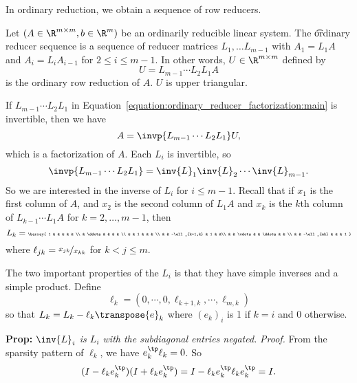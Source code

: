 

In ordinary reduction, we obtain a sequence of row reducers.


Let $(A \in \R^{m \times m}, b \in \R^{m})$ be an ordinarily reducible linear system.
The \t{ordinary reducer sequence} is a sequence of reducer matrices $L_{1}, \dots L_{m-1}$ with $A_1 = L_1A$ and $A_i = L_iA_{i-1}$ for $2 \leq i \leq m-1$.
In other words, $U \in \R^{m \times m}$ defined by
\begin{equation}
	U = L_{m-1} \cdots L_2 L_1 A
	\label{equation:ordinary_reducer_factorization:main}
\end{equation}
is the ordinary row reduction of $A$.
$U$ is upper triangular.

If $L_{m-1}\cdots L_2 L_1$ in Equation~\eqref{equation:ordinary_reducer_factorization:main} is invertible, then we have
\[
  A = \invp{L_{m-1}\cdots L_2 L_1}U,
\]
which is a factorization of $A$.
Each $L_i$ is invertible, so
\[
  \invp{L_{m-1}\cdots L_2 L_1} = \inv{L}_1\inv{L}_2\cdots\inv{L}_{m-1}.
\]
So we are interested in the inverse of $L_i$ for $i \leq m-1$.
Recall that if $x_1$ is the first column of $A$, and $x_2$ is the second column of $L_1A$ and $x_k$ is the $k$th column of $L_{k-1}\cdots L_{1}A$ for $k = 2, \dots, m-1$, then
\[{\tiny
  L_k = \barray{
    1 & & & &  & \\
    & \ddots & & & & \\
    & & 1 & & & \\
    & & -\ell_{k+1,k} & 1 & &\\
    & & \vdots & & \ddots & & \\
    & & -\ell_{mk} & & & 1
  }}
\]
where $\ell_{jk} = \nicefrac{x_{jk}}{x_{kk}}$ for $k < j \leq m$.


The two important properties of the $L_i$ is that they have simple inverses and a simple product.
Define
\[\ell_k = (0,\cdots, 0,\ell_{k+1,k}, \cdots, \ell_{m,k})\]
so that $L_k = L_k - \ell_k\transpose{e}_k$ where $(e_k)_i$ is 1 if $k = i$ and 0 otherwise.

\noindent\noindent \textbf{Prop:} {\it $\inv{L}_i$ is $L_i$ with the subdiagonal entries negated.}
\textit{Proof.} From the sparsity pattern of $\ell_k$, we have $e_k^\tp \ell_k = 0$. So
\[
	(I - \ell_ke_k^\tp)(I + \ell_ke_k^\tp) = I - \ell_ke^\tp_k\ell_ke^\tp_k = I.
\]

